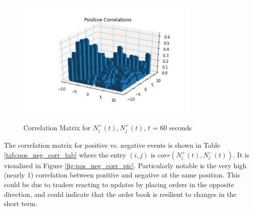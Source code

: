 \begin{figure}[t]
\begin{center}
\label{fig:pos_pos_corr_pic}
\includegraphics[width=0.8\textwidth]{LaTeX/Figures/pos_pos_correlations.png}
\caption{Correlation Matrix for $N^{+}_i(t), N^{+}_j(t)$, $t$ = 60 seconds}
\end{center}
\end{figure}

The correlation matrix for positive vs. negative events is shown in Table \ref{tab:pos_neg_corr_tab} where the entry $(i,j)$ is $corr(N^{+}_i(t), N^{-}_j(t))$. It is visualized in Figure \ref{fig:pos_neg_corr_pic}. Particularly notable is the very high (nearly 1) correlation between positive and negative at the same position. This could be due to traders reacting to updates by placing orders in the opposite direction, and could indicate that the order book is resilient to changes in the short term.

